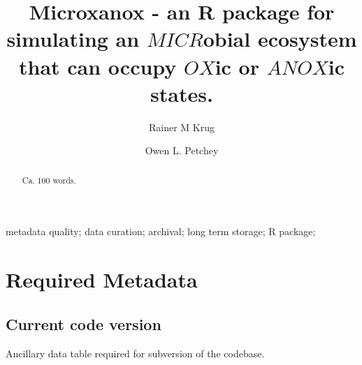 \documentclass[]{elsarticle} %
\begin{document}
\begin{frontmatter}

  \title{Microxanox - an R package for simulating an \(MICR\)obial
ecosystem that can occupy \(OX\)ic or \(ANOX\)ic states.}
    \author[University of Zürich]{Rainer M Krug}
    \author[University of Zürich]{Owen L. Petchey}
      \address[University of Zürich]{Department of Evolutionary Biology
and Environmental Studies, Winterthurerstrasse 190, 8057 Zurich}
  
  \begin{abstract}
  Ca. 100 words.
  \end{abstract}
   \begin{keyword} metadata quality; data curation; archival; long term
storage; R package;\end{keyword}
 \end{frontmatter}

\hypertarget{required-metadata}{%
\section{Required Metadata}\label{required-metadata}}

\hypertarget{current-code-version}{%
\subsection{Current code version}\label{current-code-version}}

Ancillary data table required for subversion of the codebase.
\end{document}
